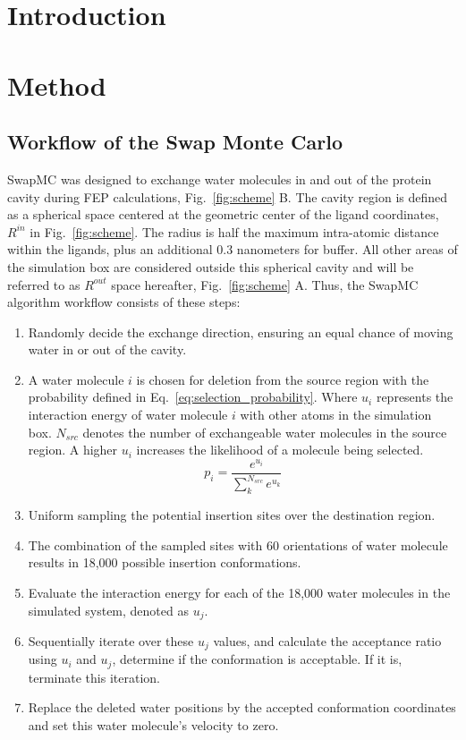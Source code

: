 \documentclass[journal=jacsat,manuscript=article]{achemso}
\newcommand{\YE}[1]{\textcolor{blue}{#1}}
\begin{document}
\section{Introduction}

\section{Method}
\subsection{Workflow of the Swap Monte Carlo}
SwapMC was designed to exchange water molecules in and out of the protein cavity during FEP calculations, Fig.~\ref{fig:scheme} B.
The cavity region is defined as a spherical space centered at the geometric center of the ligand coordinates\cite{ben2021fast}, $R^{in}$ in Fig.~\ref{fig:scheme}.
The radius is half the maximum intra-atomic distance within the ligands, plus an additional 0.3 nanometers for buffer.
All other areas of the simulation box are considered outside this spherical cavity and will be referred to as $R^{out}$ space hereafter, Fig.~\ref{fig:scheme} A.
Thus, the SwapMC algorithm workflow consists of these steps:
\begin{enumerate}
  \item Randomly decide the exchange direction, ensuring an equal chance of moving water in or out of the cavity.
  \item A water molecule $i$ is chosen for deletion from the source region with the probability defined in Eq.~\ref{eq:selection_probability}. 
    Where $u_i$ represents the interaction energy of water molecule $i$ with other atoms in the simulation box. 
    $N_{src}$ denotes the number of exchangeable water molecules in the source region. A higher $u_i$ increases the likelihood of a molecule being selected.
  \begin{equation}\label{eq:selection_probability}
     p_i = \frac{e^{u_i}}{\sum^{N_{src}}_k{e^{u_k}}} \tag{1}    
  \end{equation}
  \item Uniform sampling the potential insertion sites over the destination region.
  \item The combination of the sampled sites with 60 orientations of water molecule results in 18,000 possible insertion conformations.
  \item Evaluate the interaction energy for each of the 18,000 water molecules in the simulated system, denoted as $u_j$.
  \item Sequentially iterate over these $u_j$ values, and calculate the acceptance ratio using $u_i$ and $u_j$, determine if the conformation is acceptable. If it is, terminate this iteration.
  \item Replace the deleted water positions by the accepted conformation coordinates and set this water molecule's velocity to zero.
\end{enumerate}
\end{document}

